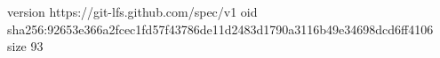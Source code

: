 version https://git-lfs.github.com/spec/v1
oid sha256:92653e366a2fcec1fd57f43786de11d2483d1790a3116b49e34698dcd6ff4106
size 93

